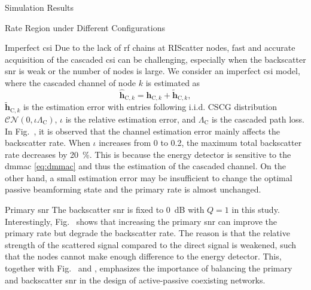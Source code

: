 \begin{section}{Simulation Results}
\begin{subsection}{Rate Region under Different Configurations}

		\begin{subsubsection}{Imperfect \gls{csi}}
			Due to the lack of \gls{rf} chains at RIScatter nodes, fast and accurate acquisition of the cascaded \gls{csi} can be challenging, especially when the backscatter \gls{snr} is weak or the number of nodes is large.
			We consider an imperfect \gls{csi} model, where the cascaded channel of node $k$ is estimated as
			\begin{equation}
				\hat{\boldsymbol{h}}_{\text{C},k} = \boldsymbol{h}_{\text{C},k} + \tilde{\boldsymbol{h}}_{\text{C},k},
			\end{equation}
			$\tilde{\boldsymbol{h}}_{\text{C},k}$ is the estimation error with entries following i.i.d. CSCG distribution $\mathcal{CN}(0, \iota \Lambda_\text{C})$, $\iota$ is the relative estimation error, and $\Lambda_\text{C}$ is the cascaded path loss.
			In Fig.~, it is observed that the channel estimation error mainly affects the backscatter rate.
			When $\iota$ increases from \num{0} to \num{0.2}, the maximum total backscatter rate decreases by \qty{20}{\percent}.
			This is because the energy detector is sensitive to the \gls{dmmac} \eqref{eq:dmmac} and thus the estimation of the cascaded channel.
			On the other hand, a small estimation error may be insufficient to change the optimal passive beamforming state and the primary rate is almost unchanged.
		\end{subsubsection}

		\begin{subsubsection}{Primary \gls{snr}}
			\label{sc:primary_snr}
			The backscatter \gls{snr} is fixed to \qty{0}{dB} with $Q=1$ in this study.
			Interestingly, Fig.~ shows that increasing the primary \gls{snr} can improve the primary rate but degrade the backscatter rate.
			The reason is that the relative strength of the scattered signal compared to the direct signal is weakened, such that the nodes cannot make enough difference to the energy detector.
			This, together with Fig.~ and , emphasizes the importance of balancing the primary and backscatter \gls{snr} in the design of active-passive coexisting networks.
		\end{subsubsection}


\end{subsection}
\end{section}
